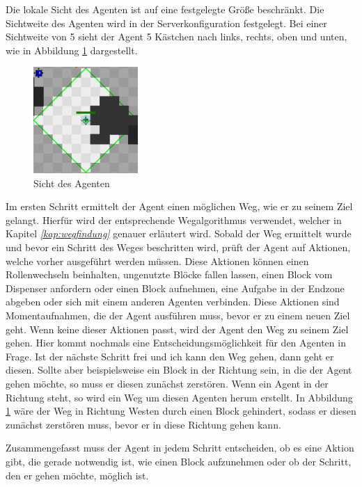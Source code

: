 Die lokale Sicht des Agenten ist auf eine festgelegte Größe beschränkt. Die Sichtweite des Agenten wird in der Serverkonfiguration festgelegt. Bei einer Sichtweite von 5 sieht der Agent 5 Kästchen nach links, rechts, oben und unten, wie in Abbildung \ref{fig:agentensicht} dargestellt.
\begin{figure}
	\centering
	\includegraphics[width=150px]{bilder/agentensicht}
	\caption{Sicht des Agenten}
	\label{fig:agentensicht}
\end{figure}

Im ersten Schritt ermittelt der Agent einen möglichen Weg, wie er zu seinem Ziel gelangt. Hierfür wird der entsprechende Wegalgorithmus verwendet, welcher in Kapitel \textit{\ref{kap:wegfindung}} genauer erläutert wird. Sobald der Weg ermittelt wurde und bevor ein Schritt des Weges beschritten wird, prüft der Agent auf Aktionen, welche vorher ausgeführt werden müssen. Diese Aktionen können einen Rollenwechseln beinhalten, ungenutzte Blöcke fallen lassen, einen Block vom Dispenser anfordern oder einen Block aufnehmen, eine Aufgabe in der Endzone abgeben oder sich mit einem anderen Agenten verbinden. Diese Aktionen sind Momentaufnahmen, die der Agent ausführen muss, bevor er zu einem neuen Ziel geht. Wenn keine dieser Aktionen passt, wird der Agent den Weg zu seinem Ziel gehen. Hier kommt nochmals eine Entscheidungsmöglichkeit für den Agenten in Frage. Ist der nächste Schritt frei und ich kann den Weg gehen, dann geht er diesen. Sollte aber beispielsweise ein Block in der Richtung sein, in die der Agent gehen möchte, so muss er diesen zunächst zerstören. Wenn ein Agent in der Richtung steht, so wird ein Weg um diesen Agenten herum erstellt. In Abbildung \ref{fig:agentensicht} wäre der Weg in Richtung Westen durch einen Block gehindert, sodass er diesen zunächst zerstören muss, bevor er in diese Richtung gehen kann. 

Zusammengefasst muss der Agent in jedem Schritt entscheiden, ob es eine Aktion gibt, die gerade notwendig ist, wie einen Block aufzunehmen oder ob der Schritt, den er gehen möchte, möglich ist.  

